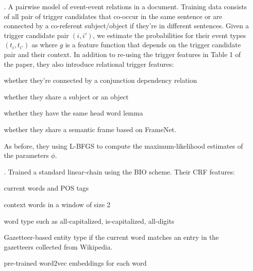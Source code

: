 \documentclass[11pt]{article}
\begin{document}
\myspace
\p {}. A pairwise model of event-event relations in a document. Training data consists of all pair of trigger candidates that co-occur in the same sentence or are connected by a co-referent subject/object if they're in different sentences. Given a trigger candidate pair $(i, i')$, we estimate the probabilities for their event types $(t_i, t_{i'})$ as
where $g$ is a feature function that depends on the trigger candidate pair and their context. In addition to re-using the trigger features in Table 1 of the paper, they also introduce relational trigger features:
\begin{compactenum}
	\item whether they're connected by a conjunction dependency relation
	\item whether they share a subject or an object
	\item whether they have the same head word lemma
	\item whether they share a semantic frame based on FrameNet. 
\end{compactenum}
As before, they using L-BFGS to compute the maximum-likelihood estimates of the parameters $\phi$. 


\myspace
\p {}. Trained a standard linear-chain  using the BIO scheme. Their CRF features:
\begin{compactenum}
	\item current words and POS tags
	\item context words in a window of size 2
	\item word type such as all-capitalized, is-capitalized, all-digits
	\item Gazetteer-based entity type if the current word matches an entry in the gazetteers collected from Wikipedia. 
	\item pre-trained word2vec embeddings for each word
\end{compactenum}
\end{document}
